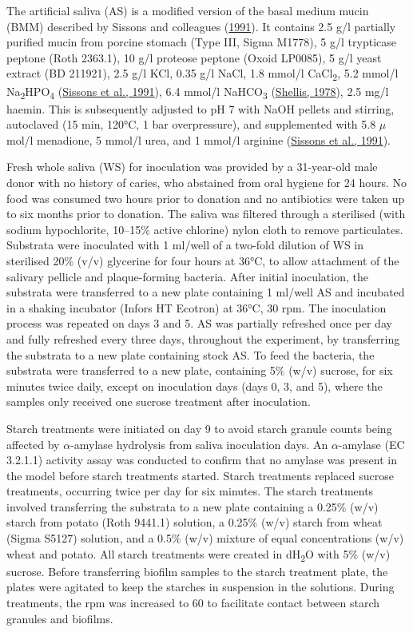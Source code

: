 \documentclass[
  b5paper,
]{book}
\begin{document}
The artificial saliva (AS) is a modified version of the basal medium
mucin (BMM) described by Sissons and colleagues
(\protect\hyperlink{ref-sissonsMultistationPlaque1991}{1991}). It
contains 2.5 g/l partially purified mucin from porcine stomach (Type
III, Sigma M1778), 5 g/l trypticase peptone (Roth 2363.1), 10 g/l
proteose peptone (Oxoid LP0085), 5 g/l yeast extract (BD 211921), 2.5
g/l KCl, 0.35 g/l NaCl, 1.8 mmol/l CaCl\textsubscript{2}, 5.2 mmol/l
Na\textsubscript{2}HPO\textsubscript{4}
(\protect\hyperlink{ref-sissonsMultistationPlaque1991}{Sissons et al.,
1991}), 6.4 mmol/l NaHCO\textsubscript{3}
(\protect\hyperlink{ref-shellisSyntheticSaliva1978}{Shellis, 1978}), 2.5
mg/l haemin. This is subsequently adjusted to pH 7 with NaOH pellets and
stirring, autoclaved (15 min, 120°C, 1 bar overpressure), and
supplemented with 5.8 \(\mu\)mol/l menadione, 5 mmol/l urea, and 1
mmol/l arginine
(\protect\hyperlink{ref-sissonsMultistationPlaque1991}{Sissons et al.,
1991}).

Fresh whole saliva (WS) for inoculation was provided by a 31-year-old
male donor with no history of caries, who abstained from oral hygiene
for 24 hours. No food was consumed two hours prior to donation and no
antibiotics were taken up to six months prior to donation. The saliva
was filtered through a sterilised (with sodium hypochlorite, 10--15\%
active chlorine) nylon cloth to remove particulates. Substrata were
inoculated with 1 ml/well of a two-fold dilution of WS in sterilised
20\% (v/v) glycerine for four hours at 36°C, to allow attachment of the
salivary pellicle and plaque-forming bacteria. After initial
inoculation, the substrata were transferred to a new plate containing 1
ml/well AS and incubated in a shaking incubator (Infors HT Ecotron) at
36°C, 30 rpm. The inoculation process was repeated on days 3 and 5. AS
was partially refreshed once per day and fully refreshed every three
days, throughout the experiment, by transferring the substrata to a new
plate containing stock AS. To feed the bacteria, the substrata were
transferred to a new plate, containing 5\% (w/v) sucrose, for six
minutes twice daily, except on inoculation days (days 0, 3, and 5),
where the samples only received one sucrose treatment after inoculation.

Starch treatments were initiated on day 9 to avoid starch granule counts
being affected by \(\alpha\)-amylase hydrolysis from saliva inoculation
days. An \(\alpha\)-amylase (EC 3.2.1.1) activity assay was conducted to
confirm that no amylase was present in the model before starch
treatments started. Starch treatments replaced sucrose treatments,
occurring twice per day for six minutes. The starch treatments involved
transferring the substrata to a new plate containing a 0.25\% (w/v)
starch from potato (Roth 9441.1) solution, a 0.25\% (w/v) starch from
wheat (Sigma S5127) solution, and a 0.5\% (w/v) mixture of equal
concentrations (w/v) wheat and potato. All starch treatments were
created in dH\textsubscript{2}O with 5\% (w/v) sucrose. Before
transferring biofilm samples to the starch treatment plate, the plates
were agitated to keep the starches in suspension in the solutions.
During treatments, the rpm was increased to 60 to facilitate contact
between starch granules and biofilms.
\end{document}
